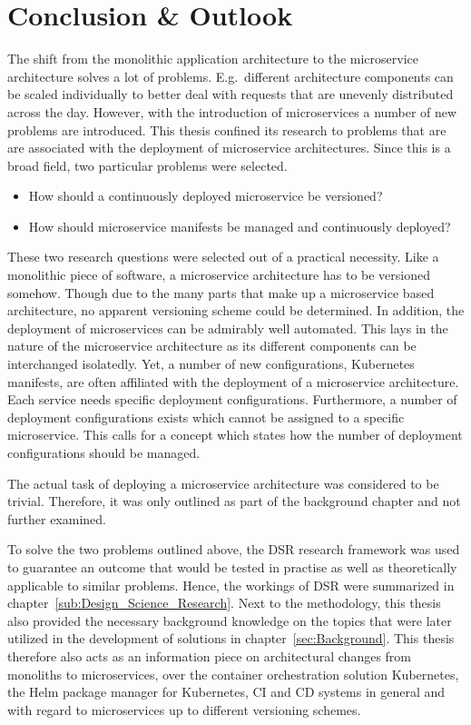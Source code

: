 
\section{Conclusion \& Outlook}%
\label{sec:Conclusion}

The shift from the monolithic application architecture to the microservice
architecture solves a lot of problems. E.g.\ different architecture components
can be scaled individually to better deal with requests that are unevenly
distributed across the day. However, with the introduction of microservices a
number of new problems are introduced. This thesis confined its research to
problems that are are associated with the deployment of microservice
architectures. Since this is a broad field, two particular problems were
selected.

\begin{itemize}
  \item How should a continuously deployed microservice be versioned?
  \item How should microservice manifests be managed and continuously deployed?
\end{itemize}

These two research questions were selected out of a practical necessity. Like a
monolithic piece of software, a microservice architecture has to be versioned
somehow. Though due to the many parts that make up a microservice based
architecture, no apparent versioning scheme could be determined. In addition,
the deployment of microservices can be admirably well automated.  This lays in
the nature of the microservice architecture as its different components can be
interchanged isolatedly. Yet, a number of new configurations, Kubernetes
manifests, are often affiliated with the deployment of a microservice
architecture. Each service needs specific deployment configurations.
Furthermore, a number of deployment configurations exists which cannot be
assigned to a specific microservice. This calls for a concept which states how
the number of deployment configurations should be managed.

The actual task of deploying a microservice architecture was considered to be
trivial. Therefore, it was only outlined as part of the background chapter and
not further examined.

To solve the two problems outlined above, the \ac{DSR} research framework was
used to guarantee an outcome that would be tested in practise as well as
theoretically applicable to similar problems. Hence, the workings of \ac{DSR}
were summarized in chapter~\ref{sub:Design_Science_Research}. Next to the
methodology, this thesis also provided the necessary background knowledge on the
topics that were later utilized in the development of solutions in
chapter~\ref{sec:Background}. This thesis therefore also acts as an information
piece on architectural changes from monoliths to microservices, over the
container orchestration solution Kubernetes, the Helm package manager for
Kubernetes, \ac{CI} and \ac{CD} systems in general and with regard to
microservices up to different versioning schemes.

